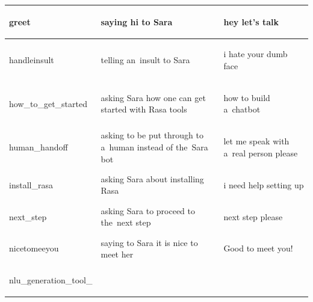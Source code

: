 \documentclass[bsc,frontabs,singlespacing,parskip,deptreport]{infthesis}
\begin{document}
{\begin{center}
\begin{longtable}{p{}|p{}|p{}}
    \hline
    \begin{spverbatim}greet\end{spverbatim} & saying hi to Sara & \begin{spverbatim}hey let's talk\end{spverbatim} \\
    \hline
    \begin{spverbatim}handleinsult\end{spverbatim} & telling an~insult to Sara & \begin{spverbatim}i hate your dumb face\end{spverbatim} \\
    \hline
    \begin{spverbatim}how_to_get_started\end{spverbatim} & asking Sara how one can get started with Rasa tools & \begin{spverbatim}how to build a~chatbot\end{spverbatim} \\
    \hline
    \begin{spverbatim}human_handoff\end{spverbatim} & asking to be put through to a~human instead of the~Sara bot & \begin{spverbatim}let me speak with a~real person please\end{spverbatim} \\
    \hline
    \begin{spverbatim}install_rasa\end{spverbatim} & asking Sara about installing Rasa & \begin{spverbatim}i need help setting up\end{spverbatim} \\
    \hline
    \begin{spverbatim}next_step\end{spverbatim} & asking Sara to proceed to the~next step & \begin{spverbatim}next step please\end{spverbatim} \\
    \hline
    \begin{spverbatim}nicetomeeyou\end{spverbatim} & saying to Sara it is nice to meet her & \begin{spverbatim}Good to meet you!\end{spverbatim} \\
    \hline
    \begin{spverbatim}nlu_generation_tool_

\end{spverbatim}
\end{longtable}
\end{center}}
\end{document}
